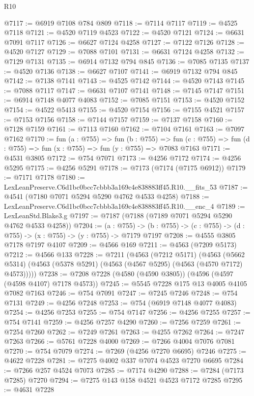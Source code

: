 \begin{lexlean}{R10}
\begin{coremodule}
@7117 := @6919 @7108 @784 @809
@7118 := @7114 @7117
@7119 := @4525 @7118
@7121 := @4520 @7119 @4523
@7122 := @4520 @7121
@7124 := @6631 @7091 @7117
@7126 := @6627 @7124 @4258
@7127 := @7122 @7126
@7128 := @4520 @7127
@7129 := @7088 @7101
@7131 := @6631 @7124 @4258
@7132 := @7129 @7131
@7135 := @6914 @7132 @794 @845
@7136 := @7085 @7135
@7137 := @4520 @7136
@7138 := @6627 @7107
@7141 := @6919 @7132 @794 @845
@7142 := @7138 @7141
@7143 := @4525 @7142
@7144 := @4520 @7143
@7145 := @7088 @7117
@7147 := @6631 @7107 @7141
@7148 := @7145 @7147
@7151 := @6914 @7148 @4077 @4083
@7152 := @7085 @7151
@7153 := @4520 @7152
@7154 := @4522 @5413
@7155 := @4520 @7154
@7156 := @7155 @4521
@7157 := @7153 @7156
@7158 := @7144 @7157
@7159 := @7137 @7158
@7160 := @7128 @7159
@7161 := @7113 @7160
@7162 := @7104 @7161
@7163 := @7097 @7162
@7170 := fun (a : @755) =>
  fun (b : @755) =>
  fun (c : @755) => fun (d : @755) => fun (x : @755) => fun (y : @755) => @7083 @7163
@7171 := @4531 @3805
@7172 := @754 @7071
@7173 := @4256 @7172
@7174 := @4256 @5295
@7175 := @4256 @5291
@7178 := @7173 (@7174 (@7175 @6912))
@7179 := @7171 @7178
@7180 := LexLeanPreserve.C6d1bc0bcc7cbbb3a169c4e838883ff45.R10.__fits_53
@7187 := @4541 (@7180 @7071 @5294 @5290 @4762 @4533 @4258)
@7188 := LexLeanPreserve.C6d1bc0bcc7cbbb3a169c4e838883ff45.R10.__enc_4
@7189 := LexLeanStd.Blake3.g
@7197 := @7187 (@7188 (@7189 @7071 @5294 @5290 @4762 @4533 @4258))
@7204 := (a : @755) ->
  (b : @755) -> (c : @755) -> (d : @755) -> (x : @755) -> (y : @755) -> @7179 @7197
@7208 := @4555 @3805 @7178 @7197 @4107
@7209 := @4566 @169
@7211 := @4563 (@7209 @5173)
@7212 := @4566 @133
@7228 := @7211
    (@4563
      (@7212 @5171)
      (@4563 (@5662 @5314) (@4563 (@5378 @5291) (@4563 (@4567 @5295) (@4563 (@4570 @7172) @4573)))))
@7238 := @7208 @7228 (@4580 (@4590 @3805)) (@4596 (@4597 (@4598 @4107) @7178 @4573))
@7245 := @5545 @7228 @175 @13 @4005 @4105 @7082 @7163
@7246 := @754 @7091
@7247 := @7245 @7246
@7248 := @754 @7131
@7249 := @4256 @7248
@7253 := @754 (@6919 @7148 @4077 @4083)
@7254 := @4256 @7253
@7255 := @754 @7147
@7256 := @4256 @7255
@7257 := @754 @7141
@7259 := @4256 @7257 @4290
@7260 := @7256 @7259
@7261 := @7254 @7260
@7262 := @7249 @7261
@7263 := @4255 @7262
@7264 := @7247 @7263
@7266 := @5761 @7228 @4000
@7269 := @7266 @4004 @7076 @7081
@7270 := @754 @7079
@7274 := @7269 (@4256 @7270 @6695) @7246
@7275 := @4622 @7228
@7281 := @7275 @4002 @337 @7074 @4523 @7270 @6695
@7284 := @7266 @257 @4524 @7073
@7285 := @7174 @4290
@7288 := @7284 (@7173 @7285) @7270
@7294 := @7275 @143 @158 @4521 @4523 @7172 @7285
@7295 := @4631 @7228

\end{coremodule}
\end{lexlean}
